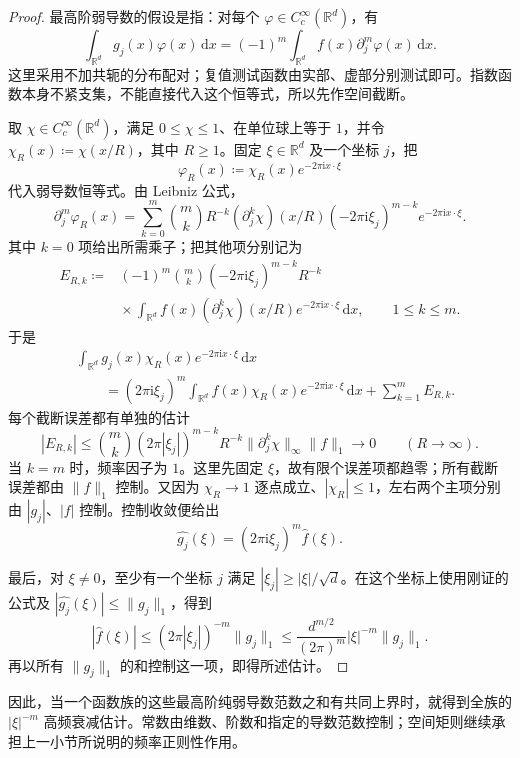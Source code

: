 \begin{proof}
最高阶弱导数的假设是指：对每个 \(\varphi\in C_c^\infty(\mathbb R^d)\)，有
\[
 \int_{\mathbb R^d}g_j(x)\varphi(x)\,\mathrm dx
 =(-1)^m\int_{\mathbb R^d}f(x)\partial_j^m\varphi(x)\,\mathrm dx.
\]
这里采用不加共轭的分布配对；复值测试函数由实部、虚部分别测试即可。指数函数本身不紧支集，不能直接代入这个恒等式，所以先作空间截断。

取 \(\chi\in C_c^\infty(\mathbb R^d)\)，满足 \(0\leq\chi\leq1\)、在单位球上等于 \(1\)，并令 \(\chi_R(x)\coloneqq\chi(x/R)\)，其中 \(R\geq1\)。固定 \(\xi\in\mathbb R^d\) 及一个坐标 \(j\)，把
\[
 \varphi_R(x)\coloneqq\chi_R(x)e^{-2\pi\mathrm i x\cdot\xi}
\]
代入弱导数恒等式。由 Leibniz 公式，
\[
 \partial_j^m\varphi_R(x)
 =\sum_{k=0}^m\binom{m}{k}R^{-k}
   (\partial_j^k\chi)(x/R)
   (-2\pi\mathrm i\xi_j)^{m-k}e^{-2\pi\mathrm i x\cdot\xi}.
\]
其中 \(k=0\) 项给出所需乘子；把其他项分别记为
\[
 \begin{aligned}
 E_{R,k}\coloneqq{}&(-1)^m\binom{m}{k}
 (-2\pi\mathrm i\xi_j)^{m-k}R^{-k}\\
 &{}\times\int_{\mathbb R^d}f(x)(\partial_j^k\chi)(x/R)
                   e^{-2\pi\mathrm i x\cdot\xi}\,\mathrm dx,
 \qquad 1\leq k\leq m.
 \end{aligned}
\]
于是
\[
 \begin{aligned}
 &\int_{\mathbb R^d}g_j(x)\chi_R(x)e^{-2\pi\mathrm i x\cdot\xi}\,\mathrm dx\\
 &\qquad=(2\pi\mathrm i\xi_j)^m
   \int_{\mathbb R^d}f(x)\chi_R(x)e^{-2\pi\mathrm i x\cdot\xi}\,\mathrm dx
   +\sum_{k=1}^m E_{R,k}.
 \end{aligned}
\]
每个截断误差都有单独的估计
\[
 |E_{R,k}|
 \leq\binom{m}{k}(2\pi|\xi_j|)^{m-k}R^{-k}
       \|\partial_j^k\chi\|_\infty\|f\|_1
 \longrightarrow0\qquad(R\to\infty).
\]
当 \(k=m\) 时，频率因子为 \(1\)。这里先固定 \(\xi\)，故有限个误差项都趋零；所有截断误差都由 \(\|f\|_1\) 控制。又因为 \(\chi_R\to1\) 逐点成立、\(|\chi_R|\leq1\)，左右两个主项分别由 \(|g_j|\)、\(|f|\) 控制。控制收敛便给出
\[
 \widehat{g_j}(\xi)=(2\pi\mathrm i\xi_j)^m\widehat f(\xi).
\]

最后，对 \(\xi\ne0\)，至少有一个坐标 \(j\) 满足 \(|\xi_j|\geq|\xi|/\sqrt d\)。在这个坐标上使用刚证的公式及 \(|\widehat{g_j}(\xi)|\leq\|g_j\|_1\)，得到
\[
 |\widehat f(\xi)|
 \leq(2\pi|\xi_j|)^{-m}\|g_j\|_1
 \leq\frac{d^{m/2}}{(2\pi)^m}|\xi|^{-m}\|g_j\|_1.
\]
再以所有 \(\|g_j\|_1\) 的和控制这一项，即得所述估计。
\end{proof}

因此，当一个函数族的这些最高阶纯弱导数范数之和有共同上界时，就得到全族的 \(|\xi|^{-m}\) 高频衰减估计。常数由维数、阶数和指定的导数范数控制；空间矩则继续承担上一小节所说明的频率正则性作用。
